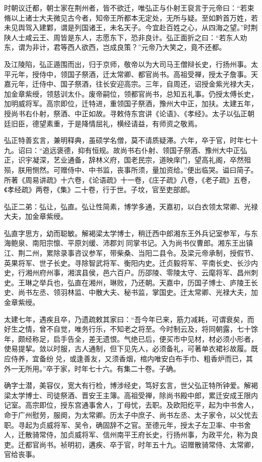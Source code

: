 \documentclass[]{article}
\begin{document}
时朝议迁都，朝士家在荆州者，皆不欲迁，唯弘正与仆射王裒言于元帝曰：``若束脩以上诸士大夫微见古今者，知帝王所都本无定处，无所与疑。至如黔首万姓，若未见舆驾入建鄴，谓是列国诸王，未名天子。今宜赴百姓之心，从四海之望。''时荆陕人士咸云王、周皆是东人，志愿东下，恐非良计。弘正面折之曰：``若东人劝东，谓为非计，君等西人欲西，岂成良策？''元帝乃大笑之，竟不还都。

及江陵陷，弘正遁围而出，归于京师，敬帝以为大司马王僧辩长史，行扬州事。太平元年，授侍中，领国子祭酒，迁太常卿、都官尚书。高祖受禅，授太子詹事。天嘉元年，迁侍中、国子祭酒，往长安迎高宗。三年，自周还，诏授金紫光禄大夫，加金章紫绶，领慈训太仆。废帝嗣位，领都官尚书，总知五礼事。仍授太傅长史，加明威将军。高宗即位，迁特进，重领国子祭酒，豫州大中正，加扶。太建五年，授尚书右仆射，祭酒、中正如故。寻敕侍东宫讲《论语》、《孝经》。太子以弘正朝廷旧臣，德望素重，于是降情屈礼，横经请益，有师资之敬焉。

弘正特善玄言，兼明释典，虽硕学名僧，莫不请质疑滞。六年，卒于官，时年七十九。诏曰：``追远褒德，抑有恒规。故尚书右仆射、领国子祭酒、豫州大中正弘正，识宇凝深，艺业通备，辞林义府，国老民宗，道映庠门，望高礼阁，卒然殂殒，朕用恻然。可赠侍中、中书监，丧事所须，量加资给。''便出临哭。谥曰简子。所著《周易讲疏》十六卷，《论语疏》十一卷，《庄子疏》八卷，《老子疏》五卷，《孝经疏》两卷，《集》二十卷，行于世。子坟，官至吏部郎。

弘正二弟：弘让，弘直。弘让性简素，博学多通，天嘉初，以白衣领太常卿、光禄大夫，加金章紫绶。

弘直字思方，幼而聪敏。解褐梁太学博士，稍迁西中郎湘东王外兵记室参军，与东海鲍泉、南阳宗懔、平原刘缓、沛郡刘同掌书记。入为尚书仪曹郎。湘东王出镇江、荆二州，累除录事咨议参军，带柴桑、当阳二县令。及梁元帝承制，授假节、英果将军、世子长史。寻除智武将军、衡阳内史。迁贞毅将军、平南长史、长沙内史，行湘州府州事，湘滨县侯，邑六百户。历邵陵、零陵太守、云麾将军、昌州刺史。王琳之举兵也，弘直在湘州，琳败，乃还朝。天嘉中，历国子博士、庐陵王长史、尚书左丞、领羽林监、中散大夫、秘书监，掌国史。迁太常卿、光禄大夫，加金章紫绶。

太建七年，遇疾且卒，乃遗疏敕其家曰：``吾今年已来，筋力减耗，可谓衰矣，而好生之情，曾不自觉，唯务行乐，不知老之将至。今时制云及，将同朝露，七十馀年，颇经称足，启手告全，差无遗恨。气绝已后，便买市中见材，材必须小形者，使易提挈。敛以时服，古人通制，但下见先人，必须备礼，可著单衣裙衫故履。既应侍养，宜备纷兑，或逢善友，又须香烟，棺内唯安白布手巾、粗香炉而已，其外一无所用。''卒于家，时年七十六。有集二十卷。子确。

确字士潜，美容仪，宽大有行检，博涉经史，笃好玄言，世父弘正特所钟爱。解褐梁太学博士、司徒祭酒、晋安王主簿。高祖受禅，除尚书殿中郎，累迁安成王限内记室。高宗即位，授东宫通事舍人，丁母忧，去职。及欧阳纥平，起为中书舍人，命于广州慰劳，服阕，为太常卿。历太子中庶子、尚书左丞、太子家令，以父忧去职。寻起为贞威将军、吴令，确固辞不之官。至德元年，授太子左卫率、中书舍人，迁散骑常侍，加贞威将军、信州南平王府长史，行扬州事，为政平允，称为良吏。迁都官尚书。祯明初，遘疾、卒于官，时年五十九。诏赠散骑常侍、太常卿，官给丧事。
\end{document}
